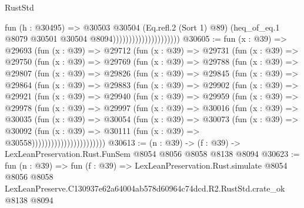 \begin{lexlean}{RustStd}
\begin{coremodule}
                                          fun (h : @30495) =>
                                          @30503
                                            @30504
                                            (Eq.refl.{2} (Sort 1) @89)
                                            (heq_of_eq.{1}
                                              @8079
                                              @30501
                                              @30504
                                              @8094)))))))))))))))))))))
@30605 := fun (x : @39) =>
  @29693
    (fun (x : @39) =>
    @29712
      (fun (x : @39) =>
      @29731
        (fun (x : @39) =>
        @29750
          (fun (x : @39) =>
          @29769
            (fun (x : @39) =>
            @29788
              (fun (x : @39) =>
              @29807
                (fun (x : @39) =>
                @29826
                  (fun (x : @39) =>
                  @29845
                    (fun (x : @39) =>
                    @29864
                      (fun (x : @39) =>
                      @29883
                        (fun (x : @39) =>
                        @29902
                          (fun (x : @39) =>
                          @29921
                            (fun (x : @39) =>
                            @29940
                              (fun (x : @39) =>
                              @29959
                                (fun (x : @39) =>
                                @29978
                                  (fun (x : @39) =>
                                  @29997
                                    (fun (x : @39) =>
                                    @30016
                                      (fun (x : @39) =>
                                      @30035
                                        (fun (x : @39) =>
                                        @30054
                                          (fun (x : @39) =>
                                          @30073
                                            (fun (x : @39) =>
                                            @30092
                                              (fun (x : @39) =>
                                              @30111 (fun (x : @39) => @30558)))))))))))))))))))))))
@30613 := (n : @39) -> (f : @39) -> LexLeanPreservation.Rust.FunSem @8054 @8056 @8058 @8138 @8094
@30623 := fun (n : @39) =>
  fun (f : @39) =>
  LexLeanPreservation.Rust.simulate
    @8054
    @8056
    @8058
    LexLeanPreserve.C130937e62a64004ab578d60964c74dcd.R2.RustStd.crate_ok
    @8138
    @8094
\end{coremodule}
\end{lexlean}
